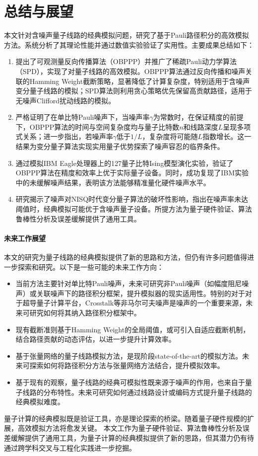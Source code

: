 \chapter{总结与展望}


本文针对含噪声量子线路的经典模拟问题，研究了基于Pauli路径积分的高效模拟方法。系统分析了其理论性能并通过数值实验验证了实用性。主要成果总结如下：
\begin{enumerate}
    \item 提出了可观测量反向传播算法（OBPPP）并推广了稀疏Pauli动力学算法（SPD），实现了对量子线路的高效模拟。OBPPP算法通过反向传播和噪声关联的Hamming Weight截断策略，显著降低了计算复杂度，特别适用于含噪声变分量子线路的模拟；SPD算法则利用贪心策略优先保留高贡献路径，适用于无噪声Clifford扰动线路的模拟。
    \item 严格证明了在单比特Pauli噪声下，当噪声率$\gamma$为常数时，在保证精度的前提下，OBPPP算法的时间与空间复杂度均与量子比特数$n$和线路深度$L$呈现多项式关系；进一步指出，若噪声率$\gamma$低于$1/L$，复杂度将可能随$L$指数增长。这一结果为变分量子算法实现实用量子优势探索了噪声容忍的临界条件。
    \item 通过模拟IBM Eagle处理器上的127量子比特Ising模型演化实验，验证了OBPPP算法在精度和效率上优于实际量子设备。同时，成功复现了IBM实验中的未缓解噪声结果，表明该方法能够精准量化硬件噪声水平。
    \item 研究揭示了噪声对NISQ时代变分量子算法的破坏性影响，指出在噪声率未达阈值时，经典模拟可能优于含噪声量子设备。所提方法为量子硬件验证、算法鲁棒性分析及误差缓解提供了通用工具。
\end{enumerate}


\subsubsection{未来工作展望}
本文的研究为量子线路的经典模拟提供了新的思路和方法，但仍有许多问题值得进一步探索和研究。以下是一些可能的未来工作方向：
\begin{itemize}
    \item 当前方法主要针对单比特Pauli噪声，未来可研究非Pauli噪声（如幅度阻尼噪声）或关联噪声下的路径积分框架，提升模拟器的现实适用性。特别的对于对于超导量子计算平台，Crosstalk等非马尔可夫噪声是噪声的一个重要来源，未来可研究如何将其纳入路径积分框架中。
    \item 现有截断准则基于Hamming Weight的全局阈值，或可引入自适应截断机制，结合路径贡献的动态评估，以进一步提升计算效率。
    \item 基于张量网络的量子线路模拟方法，是现阶段state-of-the-art的模拟方法。未来可探索如何将路径积分方法与张量网络方法结合，提升模拟效率。
    \item 基于现有的观察，量子线路的经典可模拟性既来源于噪声的作用，也来自于量子线路的分布特性。未来可研究如何通过线路设计或编码方式提升量子线路的经典模拟难度。
\end{itemize}

量子计算的经典模拟既是验证工具，亦是理论探索的桥梁。随着量子硬件规模的扩展，高效模拟方法将愈发关键。
本文工作为量子硬件验证、算法鲁棒性分析及误差缓解提供了通用工具，为量子计算的经典模拟提供了新的思路，但其潜力仍有待通过跨学科交叉与工程化实践进一步挖掘。